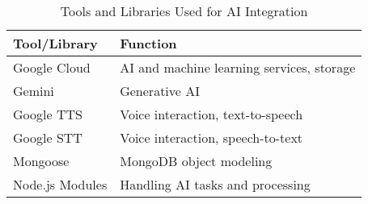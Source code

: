 
\begin{table}[h]
    \centering
    \begin{tabular}{|l|l|}
        \hline
        \textbf{Tool/Library} & \textbf{Function} \\
        \hline
        Google Cloud & AI and machine learning services, storage \\
        Gemini & Generative AI \\
        Google TTS & Voice interaction, text-to-speech \\
        Google STT & Voice interaction, speech-to-text \\
        Mongoose & MongoDB object modeling \\
        Node.js Modules & Handling AI tasks and processing \\
        \hline
    \end{tabular}
    \caption{Tools and Libraries Used for AI Integration}
    \label{tab:ai_tools}
\end{table}